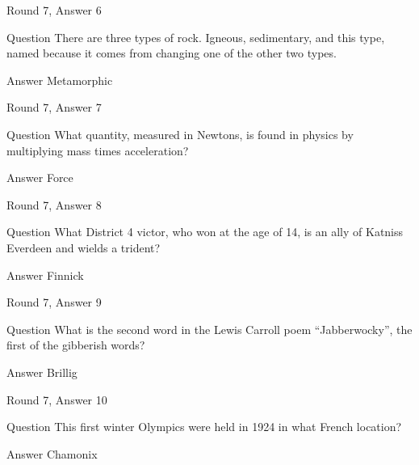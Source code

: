 \documentclass[11pt]{beamer}
\begin{document}
\begin{frame}[t]{Round 7, Answer 6}
\vspace{2em}
\begin{block}{Question}
There are three types of rock. Igneous, sedimentary, and this type, named because it comes from changing one of the other two types.
\end{block}
\pause{}
\begin{block}{Answer}
Metamorphic
\end{block}
\end{frame}
    

\begin{frame}[t]{Round 7, Answer 7}
\vspace{2em}
\begin{block}{Question}
What quantity, measured in Newtons, is found in physics by multiplying mass times acceleration\@?
\end{block}
\pause{}
\begin{block}{Answer}
Force
\end{block}
\end{frame}
    

\begin{frame}[t]{Round 7, Answer 8}
\vspace{2em}
\begin{block}{Question}
What District 4 victor, who won at the age of 14, is an ally of Katniss Everdeen and wields a trident\@?
\end{block}
\pause{}
\begin{block}{Answer}
Finnick
\end{block}
\end{frame}
    

\begin{frame}[t]{Round 7, Answer 9}
\vspace{2em}
\begin{block}{Question}
What is the second word in the Lewis Carroll poem ``Jabberwocky'', the first of the gibberish words\@?
\end{block}
\pause{}
\begin{block}{Answer}
Brillig
\end{block}
\end{frame}
    

\begin{frame}[t]{Round 7, Answer 10}
\vspace{2em}
\begin{block}{Question}
This first winter Olympics were held in 1924 in what French location\@?
\end{block}
\pause{}
\begin{block}{Answer}
Chamonix
\end{block}
\end{frame}
    
\end{document}
